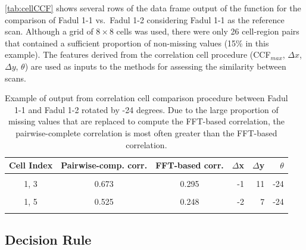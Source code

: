 \autoref{tab:cellCCF} shows several rows of the data frame output of the
 function for the comparison of Fadul 1-1
vs.~Fadul 1-2 considering Fadul 1-1 as the reference scan. Although a
grid of \(8 \times 8\) cells was used, there were only 26 cell-region
pairs that contained a sufficient proportion of non-missing values (15\%
in this example). The features derived from the correlation cell
procedure (CCF\(_{max}\), \(\Delta x\), \(\Delta y\), \(\theta\)) are
used as inputs to the methods for assessing the similarity between
scans.

\begin{Schunk}
\begin{table}

\caption{\label{tab:unnamed-chunk-13}\label{tab:cellCCF} Example of output from correlation cell comparison procedure between Fadul 1-1 and Fadul 1-2 rotated by -24 degrees. Due to the large proportion of missing values that are replaced to compute the FFT-based correlation, the pairwise-complete correlation is most often greater than the FFT-based correlation.}
\centering
\begin{tabular}[t]{|cccrrr|}
\toprule
Cell Index & Pairwise-comp. corr. & FFT-based corr. & $\Delta$x & $\Delta$y & $\theta$\\
\midrule
\cellcolor{lightgray}{1, 2} & \cellcolor{lightgray}{0.630} & \cellcolor{lightgray}{0.214} & \cellcolor{lightgray}{31} & \cellcolor{lightgray}{22} & \cellcolor{lightgray}{-24}\\
1, 3 & 0.673 & 0.295 & -1 & 11 & -24\\
\cellcolor{lightgray}{1, 4} & \cellcolor{lightgray}{0.634} & \cellcolor{lightgray}{0.255} & \cellcolor{lightgray}{-2} & \cellcolor{lightgray}{7} & \cellcolor{lightgray}{-24}\\
1, 5 & 0.525 & 0.248 & -2 & 7 & -24\\
\cellcolor{lightgray}{1, 6} & \cellcolor{lightgray}{0.658} & \cellcolor{lightgray}{0.294} & \cellcolor{lightgray}{-1} & \cellcolor{lightgray}{7} & \cellcolor{lightgray}{-24}\\
\bottomrule
\end{tabular}
\end{table}

\end{Schunk}

\hypertarget{decision-rule}{%
\subsection{Decision Rule}\label{decision-rule}}

